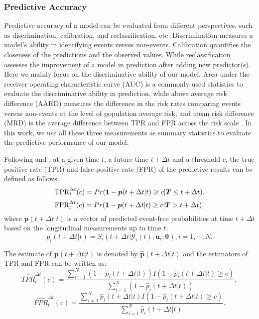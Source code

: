 \subsubsection{Predictive Accuracy} \label{sec:p3ppred_accuracy}
Predictive accuracy of a model can be evaluated from different perspectives, such as discrimination, calibration, and reclassification, etc. Discrimination measures a model's ability in identifying events versus non-events. Calibration quantifies the closeness of the predictions and the observed values. While reclassification assesses the improvement of a model in prediction after adding new predictor(s). Here we mainly focus on the discriminative ability of our model. Area under the receiver operating characteristic curve (AUC) is a commonly used statistics to evaluate the discriminative ability in prediction, while above average risk difference (AARD) measures the difference in the risk rates comparing events versus non-events at the level of population average risk, and mean risk difference (MRD) is the average difference between TPR and FPR across the risk scale \citep{pepe2008comments}. In this work, we use all these three measurements as summary statistics to evaluate the predictive performance of our model.


Following \cite{zheng2013adopting} and \cite{yang2015prediction}, at a given time $t$, a future time $t+\Delta t$ and a threshold $c$, the true positive rate (TPR) and false positive rate (FPR) of the predictive results can be defined as follows:
\[\mbox{TPR}_t^{\Delta t}(c)=Pr({\bf 1} - \boldsymbol{p}(t+\Delta t|t)\ge c | \boldsymbol{T}\le t+\Delta t),\]
\[\mbox{FPR}_t^{\Delta t}(c)=Pr({\bf 1} -\boldsymbol{p}(t+\Delta t|t)\ge c | \boldsymbol{T} > t+\Delta t),\]
where $\boldsymbol{p}(t+\Delta t | t)$ is a vector of predicted event-free probabilities at time $t+\Delta t$ based on the longitudinal measurements up to time $t$:
\[p_i(t+\Delta t | t) = S_i(t+\Delta t| \mathcal{Y}_{i}(t), {\boldsymbol u}_i;\boldsymbol{\theta}), i = 1, \cdots, N.\]

The estimate of $\boldsymbol{p}(t+\Delta t | t)$ is denoted by $\hat{\boldsymbol{p}}(t+\Delta t | t)$ and the estimators of TPR and FPR can be written as:
\begin{equation*}\label{p3est_pTPR}
\widehat{TPR}_{t}^{\Delta t}(c) = \frac{\sum_{i=1}^{N}(1 -\hat{p}_i(t+\Delta t|t))I(1 -\hat{p}_i(t+\Delta t|t)\ge c)}{\sum_{i=1}^{N}(1 - \hat{p}_i(t+\Delta t|t))},
\end{equation*}
\begin{equation*}\label{p3est_pFPR}
\widehat{FPR}_{t}^{\Delta t}(c) = \frac{\sum_{i=1}^{N}\hat{p}_i(t+\Delta t|t)I(1 -\hat{p}_i(t+\Delta t|t)\ge c)}{\sum_{i=1}^{N}\hat{p}_i(t+\Delta t|t)}.
\end{equation*}


